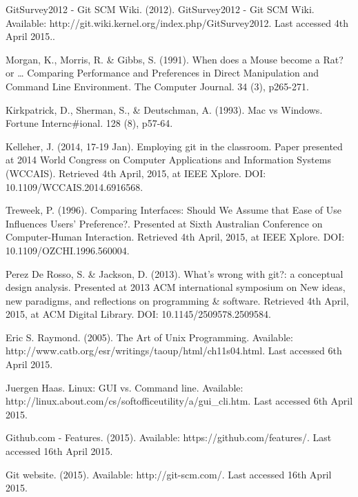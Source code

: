 \documentclass[12pt,a4paper,article,compsoc]{IEEEtran}
\begin{document}
		\newpage
		\begin{thebibliography}{1}
			
			GitSurvey2012 - Git SCM Wiki. (2012). GitSurvey2012 - Git SCM Wiki. Available: http://git.wiki.kernel.org/index.php/GitSurvey2012. Last accessed 4th April 2015..
			
			Morgan, K., Morris, R. \& Gibbs, S. (1991). When does a Mouse become a Rat? or … Comparing Performance and Preferences in Direct Manipulation and Command Line Environment. The Computer Journal. 34 (3), p265-271.
			
			Kirkpatrick, D., Sherman, S., \& Deutschman, A. (1993). Mac vs Windows. Fortune Internc\#ional. 128 (8), p57-64.
			
			Kelleher, J. (2014, 17-19 Jan). Employing git in the classroom. Paper presented at 2014 World Congress on Computer Applications and Information Systems (WCCAIS). Retrieved 4th April, 2015, at IEEE Xplore. DOI: 10.1109/WCCAIS.2014.6916568.
			
			Treweek, P. (1996). Comparing Interfaces: Should We Assume that Ease of Use Influences Users' Preference?. Presented at Sixth Australian Conference on Computer-Human Interaction. Retrieved 4th April, 2015, at IEEE Xplore. DOI: 10.1109/OZCHI.1996.560004.
			
			
			Perez De Rosso, S. \& Jackson, D. (2013). What's wrong with git?: a conceptual design analysis. Presented at 2013 ACM international symposium on New ideas, new paradigms, and reflections on programming \& software. Retrieved 4th April, 2015, at ACM Digital Library. DOI: 10.1145/2509578.2509584.
			
			Eric S. Raymond. (2005). The Art of Unix Programming.
			Available: http://www.catb.org/esr/writings/taoup/html/ch11s04.html.
			Last accessed 6th April 2015.
			
			Juergen Haas. Linux: GUI vs. Command line. Available: http://linux.about.com/cs/softofficeutility/a/gui\_cli.htm. Last accessed 6th April 2015.
			
			Github.com - Features. (2015). Available: https://github.com/features/. Last accessed 16th April 2015.
			
			Git website. (2015). Available: http://git-scm.com/. Last accessed 16th April 2015.
			
		\end{thebibliography}
\end{document}
